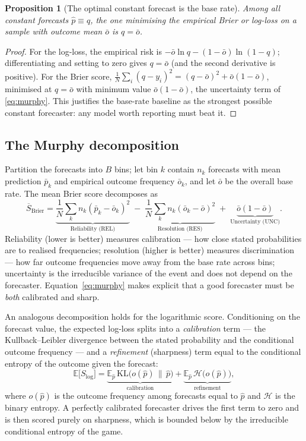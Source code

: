 \documentclass[11pt]{article}
\newtheorem{proposition}{Proposition}
\begin{document}
\begin{proposition}[The optimal constant forecast is the base rate]
\label{prop:baseline}
Among all constant forecasts $\hat p \equiv q$, the one minimising the empirical
Brier or log-loss on a sample with outcome mean $\bar o$ is $q = \bar o$.
\end{proposition}
\begin{proof}
For the log-loss, the empirical risk is
$-\bar o \ln q - (1-\bar o)\ln(1-q)$; differentiating and setting to zero gives
$q = \bar o$ (and the second derivative is positive). For the Brier score,
$\frac1N\sum_i (q-y_i)^2 = (q-\bar o)^2 + \bar o(1-\bar o)$, minimised at
$q=\bar o$ with minimum value $\bar o(1-\bar o)$, the uncertainty term of
\eqref{eq:murphy}. This justifies the base-rate baseline as the strongest possible
constant forecaster: any model worth reporting must beat it.
\end{proof}

\subsection{The Murphy decomposition}
Partition the forecasts into $B$ bins; let bin $k$ contain $n_k$ forecasts with
mean prediction $\bar p_k$ and empirical outcome frequency $\bar o_k$, and let
$\bar o$ be the overall base rate. The mean Brier score decomposes as
\begin{equation}
\overline{S}_{\mathrm{Brier}}
= \underbrace{\frac{1}{N}\sum_k n_k(\bar p_k - \bar o_k)^2}_{\text{Reliability (REL)}}
\;-\; \underbrace{\frac{1}{N}\sum_k n_k(\bar o_k - \bar o)^2}_{\text{Resolution (RES)}}
\;+\; \underbrace{\bar o(1-\bar o)}_{\text{Uncertainty (UNC)}}.
\label{eq:murphy}
\end{equation}
Reliability (lower is better) measures calibration --- how close stated
probabilities are to realised frequencies; resolution (higher is better)
measures discrimination --- how far outcome frequencies move away from the base
rate across bins; uncertainty is the irreducible variance of the event and does
not depend on the forecaster. Equation~\eqref{eq:murphy} makes explicit that a
good forecaster must be \emph{both} calibrated and sharp.

An analogous decomposition holds for the logarithmic score. Conditioning on the
forecast value, the expected log-loss splits into a \emph{calibration} term --- the
Kullback--Leibler divergence between the stated probability and the conditional
outcome frequency --- and a \emph{refinement} (sharpness) term equal to the
conditional entropy of the outcome given the forecast:
\[
\mathbb{E}\big[S_{\log}\big]
= \underbrace{\mathbb{E}_{\hat p}\,\mathrm{KL}\!\big(o(\hat p)\,\|\,\hat p\big)}_{\text{calibration}}
+ \underbrace{\mathbb{E}_{\hat p}\,\mathcal H\!\big(o(\hat p)\big)}_{\text{refinement}},
\]
where $o(\hat p)$ is the outcome frequency among forecasts equal to $\hat p$ and
$\mathcal H$ is the binary entropy. A perfectly calibrated forecaster drives the
first term to zero and is then scored purely on sharpness, which is bounded below
by the irreducible conditional entropy of the game.
\end{document}
